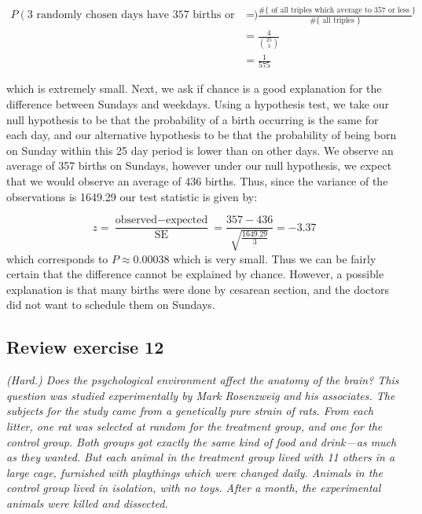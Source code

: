 \documentclass[11pt]{article}
\begin{document}
\begin{align*}
P(\text{3 randomly chosen days have 357 births or less}) &= \frac{\# \{\text{ of all triples which average to 357 or less }\}}{\# \{\text{ all triples }\}}\\
& = \frac{4}{\binom{25}{3}}\\
& = \frac{1}{575}
\end{align*}

\noindent which is extremely small. Next, we ask if chance is a good explanation for the difference between Sundays and weekdays. Using a hypothesis test, we take our null hypothesis to be that the probability of a birth occurring is the same for each day, and our alternative hypothesis to be that the probability of being born on Sunday within this 25 day period is lower than on other days. We observe an average of 357 births on Sundays, however under our null hypothesis, we expect that we would observe an average of 436 births. Thus, since the variance of the observations is 1649.29 our test statistic is given by:

$$z = \frac{\text{observed} - \text{expected}}{\text{SE}} = \frac{357 - 436}{\sqrt{\frac{1649.29}{3}}} = -3.37 $$
\noindent which corresponds to $P \approx 0.00038$ which is very small. Thus we can be fairly certain that the difference cannot be explained by chance. However, a possible explanation is that many births were done by cesarean section, and the doctors did not want to schedule them on Sundays.



\subsection*{Review exercise 12} %
\noindent \emph{(Hard.) Does the psychological environment affect the anatomy of the brain? This question was studied experimentally by Mark Rosenzweig and his associates. The subjects for the study came from a genetically pure strain of rats. From each litter, one rat was selected at random for the treatment group, and one for the control group. Both groups got exactly the same kind of food and drink---as much as they wanted. But each animal in the treatment group lived with 11 others in a large cage, furnished with playthings which were changed daily. Animals in the control group lived in isolation, with no toys. After a month, the experimental animals were killed and dissected.}\\
\end{document}
